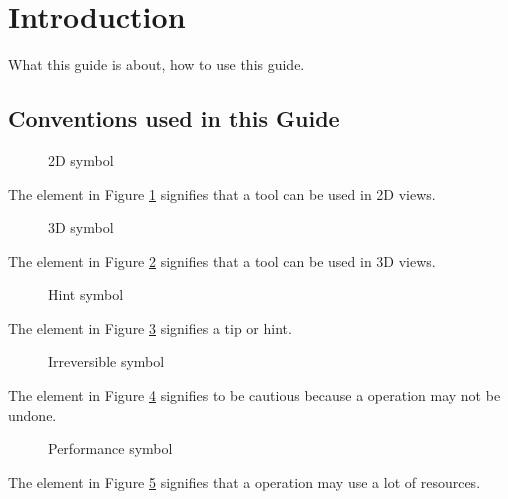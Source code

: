 \section{Introduction}
What this guide is about, how to use this guide.

\subsection{Conventions used in this Guide}
\begin{figure}[h!] %
	\centering
	
	\caption{2D symbol}
	\label{fig:2d_icon}
\end{figure}
\noindent
The element in Figure \ref{fig:2d_icon} signifies that a tool can be used in 2D views.\newline

\begin{figure}[h!] %
	\centering
	
	\caption{3D symbol}
	\label{fig:3d_icon}
\end{figure}
\noindent
The element in Figure \ref{fig:3d_icon} signifies that a tool can be used in 3D views.\newline

\begin{figure}[h!] %
	\centering
	
	\caption{Hint symbol}
	\label{fig:hint_icon}
\end{figure}
\noindent
The element in Figure \ref{fig:hint_icon} signifies a tip or hint.\newline

\begin{figure}[h!] %
	\centering
	
	\caption{Irreversible symbol}
	\label{fig:noundo_icon}
\end{figure}
\noindent
The element in Figure \ref{fig:noundo_icon} signifies to be cautious because a operation may not be undone.\pagebreak

\begin{figure}[h!] %
	\centering
	
	\caption{Performance symbol}
	\label{fig:performance_icon}
\end{figure}
\noindent
The element in Figure \ref{fig:performance_icon} signifies that a operation may use a lot of resources.\newline

